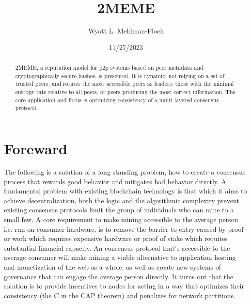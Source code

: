 \documentclass{article}
\title{2MEME}
\author{Wyatt L. Meldman-Floch}
\date{11/27/2023}
\begin{document}
\maketitle

\begin{abstract}
2MEME, a reputation model for p2p systems based on peer metadata and cryptographically secure hashes, is presented. It is dynamic, not relying on a set of trusted peers, and rotates the most accessible peers as leaders: those with the minimal entropy rate relative to all peers, or peers producing the most correct information. The core application and focus is optimizing consistency of a multi-layered consensus protocol. 

\end{abstract}

\tableofcontents

\setcounter{secnumdepth}{0}

\section{Foreward}
The following is a solution of a long standing problem, how to create a consensus process that rewards good behavior and mitigates bad behavior directly. A fundamental problem with existing blockchain technology is that which it aims to achieve decentralization, both the logic and the algorithmic complexity prevent existing consensus protocols limit the group of individuals who can mine to a small few. A core requirement to make mining accessible to the average person i.e. run on consumer hardware, is to remove the barrier to entry caused by proof or work which requires expensive hardware or proof of stake which requites substantial financial capacity. An consensus protocol that's accessible to the average consumer will make mining a viable alternative to application hosting and monetization of the web as a whole, as well as create new systems of governance that can engage the average person directly. It turns out that the solution is to provide incentives to nodes for acting in a way that optimizes their consistency (the C in the CAP theorem) and penalizes for network partitions.
\end{document}

